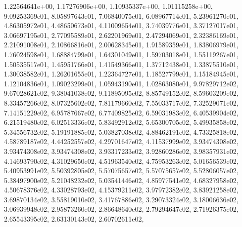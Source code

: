 \documentclass[letterpaper,10pt,english]{sphinxmanual}
\begin{document}
\begin{fulllineitems}
1.22564641e+00, 1.17276906e+00, 1.10935337e+00, 1.01115258e+00, 9.09253369e\sphinxhyphen{}01, 8.05897643e\sphinxhyphen{}01, 7.06840075e\sphinxhyphen{}01, 6.08967714e\sphinxhyphen{}01, 5.23961270e\sphinxhyphen{}01, 4.86305972e\sphinxhyphen{}01, 4.48650673e\sphinxhyphen{}01, 4.11009654e\sphinxhyphen{}01, 3.74039776e\sphinxhyphen{}01, 3.37127017e\sphinxhyphen{}01, 3.06697195e\sphinxhyphen{}01, 2.77095589e\sphinxhyphen{}01, 2.62201969e\sphinxhyphen{}01, 2.47294069e\sphinxhyphen{}01, 2.32386169e\sphinxhyphen{}01, 2.21091008e\sphinxhyphen{}01, 2.10866816e\sphinxhyphen{}01, 2.00628345e\sphinxhyphen{}01, 1.91589359e\sphinxhyphen{}01, 1.83806979e\sphinxhyphen{}01, 1.76024598e\sphinxhyphen{}01, 1.68884799e\sphinxhyphen{}01, 1.64301049e\sphinxhyphen{}01, 1.59703018e\sphinxhyphen{}01, 1.55119267e\sphinxhyphen{}01, 1.50535517e\sphinxhyphen{}01, 1.45951766e\sphinxhyphen{}01, 1.41549366e\sphinxhyphen{}01, 1.37712438e\sphinxhyphen{}01, 1.33875510e\sphinxhyphen{}01, 1.30038582e\sphinxhyphen{}01, 1.26201655e\sphinxhyphen{}01, 1.22364727e\sphinxhyphen{}01, 1.18527799e\sphinxhyphen{}01, 1.15184945e\sphinxhyphen{}01, 1.12104836e\sphinxhyphen{}01, 1.09023299e\sphinxhyphen{}01, 1.05943190e\sphinxhyphen{}01, 1.02863080e\sphinxhyphen{}01, 9.97829712e\sphinxhyphen{}02, 9.67028621e\sphinxhyphen{}02, 9.38041038e\sphinxhyphen{}02, 9.11895095e\sphinxhyphen{}02, 8.85749152e\sphinxhyphen{}02, 8.59603209e\sphinxhyphen{}02, 8.33457266e\sphinxhyphen{}02, 8.07325602e\sphinxhyphen{}02, 7.81179660e\sphinxhyphen{}02, 7.55033717e\sphinxhyphen{}02, 7.32529071e\sphinxhyphen{}02, 7.14151229e\sphinxhyphen{}02, 6.95787667e\sphinxhyphen{}02, 6.77409825e\sphinxhyphen{}02, 6.59031983e\sphinxhyphen{}02, 6.40539904e\sphinxhyphen{}02, 6.21519480e\sphinxhyphen{}02, 6.02513336e\sphinxhyphen{}02, 5.83492912e\sphinxhyphen{}02, 5.65300705e\sphinxhyphen{}02, 5.49935858e\sphinxhyphen{}02, 5.34556732e\sphinxhyphen{}02, 5.19191885e\sphinxhyphen{}02, 5.03827038e\sphinxhyphen{}02, 4.88462191e\sphinxhyphen{}02, 4.73325818e\sphinxhyphen{}02, 4.58789187e\sphinxhyphen{}02, 4.44252557e\sphinxhyphen{}02, 4.29701647e\sphinxhyphen{}02, 4.11537999e\sphinxhyphen{}02, 3.93474308e\sphinxhyphen{}02, 3.93474308e\sphinxhyphen{}02, 3.93474308e\sphinxhyphen{}02, 3.93317233e\sphinxhyphen{}02, 3.92860286e\sphinxhyphen{}02, 3.98357931e\sphinxhyphen{}02, 4.14693790e\sphinxhyphen{}02, 4.31029650e\sphinxhyphen{}02, 4.51963540e\sphinxhyphen{}02, 4.75953263e\sphinxhyphen{}02, 5.01656539e\sphinxhyphen{}02, 5.40953991e\sphinxhyphen{}02, 5.50392805e\sphinxhyphen{}02, 5.57075657e\sphinxhyphen{}02, 5.57075657e\sphinxhyphen{}02, 5.52806057e\sphinxhyphen{}02, 5.38497900e\sphinxhyphen{}02, 5.21048232e\sphinxhyphen{}02, 5.03541446e\sphinxhyphen{}02, 4.85977541e\sphinxhyphen{}02, 4.68327958e\sphinxhyphen{}02, 4.50678376e\sphinxhyphen{}02, 4.33028793e\sphinxhyphen{}02, 4.15379211e\sphinxhyphen{}02, 3.97972382e\sphinxhyphen{}02, 3.83921258e\sphinxhyphen{}02, 3.69870134e\sphinxhyphen{}02, 3.55819010e\sphinxhyphen{}02, 3.41767886e\sphinxhyphen{}02, 3.29073324e\sphinxhyphen{}02, 3.18006636e\sphinxhyphen{}02, 3.06939948e\sphinxhyphen{}02, 2.95873260e\sphinxhyphen{}02, 2.86648640e\sphinxhyphen{}02, 2.79294647e\sphinxhyphen{}02, 2.71926375e\sphinxhyphen{}02, 2.65543395e\sphinxhyphen{}02, 2.63130143e\sphinxhyphen{}02, 2.60702611e\sphinxhyphen{}02, 
\end{fulllineitems}
\end{document}
